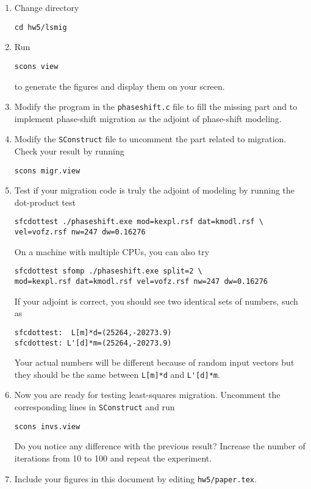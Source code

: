 \begin{enumerate}
\begin{enumerate}
\item Change directory 
\begin{verbatim}
cd hw5/lsmig
\end{verbatim}
\item Run
\begin{verbatim}
scons view
\end{verbatim}
to generate the figures and display them on your screen.
\item Modify the program in the \texttt{phaseshift.c} file to fill the missing part and to implement phase-shift migration as the adjoint of phase-shift modeling. 
\item Modify the \texttt{SConstruct} file to uncomment the part related to migration. Check your result by running
\begin{verbatim}
scons migr.view
\end{verbatim}
\item Test if your migration code is truly the adjoint of modeling by running the dot-product test
\begin{verbatim}
sfcdottest ./phaseshift.exe mod=kexpl.rsf dat=kmodl.rsf \
vel=vofz.rsf nw=247 dw=0.16276
\end{verbatim}
On a machine with multiple CPUs, you can also try
\begin{verbatim}
sfcdottest sfomp ./phaseshift.exe split=2 \
mod=kexpl.rsf dat=kmodl.rsf vel=vofz.rsf nw=247 dw=0.16276
\end{verbatim}
If your adjoint is correct, you should see two identical sets of numbers, such as
\begin{verbatim}
sfcdottest:  L[m]*d=(25264,-20273.9)
sfcdottest: L'[d]*m=(25264,-20273.9)
\end{verbatim}
Your actual numbers will be different because of random input vectors but they should be the same between \verb+L[m]*d+ and \verb+L'[d]*m+.
\item Now you are ready for testing least-squares migration. Uncomment the corresponding lines in \texttt{SConstruct} and run
\begin{verbatim}
scons invs.view
\end{verbatim}
Do you notice any difference with the previous result? Increase the
number of iterations from 10 to 100 and repeat the experiment.  
\item Include your figures in this document by 
      editing \texttt{hw5/paper.tex}.
\end{enumerate}

\newpage

\lstset{language=python,numbers=left,numberstyle=\tiny,showstringspaces=false}


\lstset{language=c,numbers=left,numberstyle=\tiny,showstringspaces=false}


\end{enumerate}

